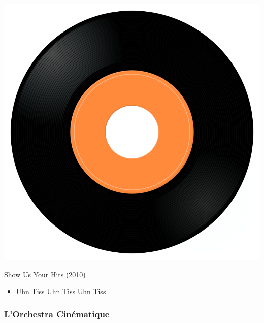 \begin{minipage}[t]{0.25\textwidth}\vspace{0pt}
\captionsetup{type=figure}
\includegraphics[width=\textwidth]{Images/cover.png}
\caption*{Show Us Your Hits (2010)}
\end{minipage}
\begin{minipage}[t]{0.25\textwidth}\vspace{0pt}
\begin{itemize}[nosep,leftmargin=1em,labelwidth=*,align=left]
	\setlength{\itemsep}{0pt}
	\item Uhn Tiss Uhn Tiss Uhn Tiss
\end{itemize}
\end{minipage}

\subsubsection{L'Orchestra Cinématique}

